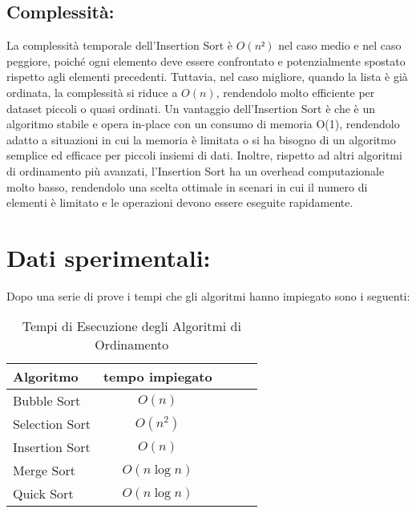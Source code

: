\documentclass[a4paper]{article}
\begin{document}
\subsection{Complessità:}
La complessità temporale dell’Insertion Sort è \(O(n²)\) nel caso medio e nel caso peggiore, poiché ogni elemento deve essere confrontato e potenzialmente
spostato rispetto agli elementi precedenti. Tuttavia, nel caso migliore, quando la lista è già ordinata, la complessità si riduce a \(O(n)\), rendendolo
molto efficiente per dataset piccoli o quasi ordinati. Un vantaggio dell’Insertion Sort è che è un algoritmo stabile e opera in-place con un consumo 
di memoria O(1), rendendolo adatto a situazioni in cui la memoria è limitata o si ha bisogno di un algoritmo semplice ed efficace per piccoli insiemi 
di dati. Inoltre, rispetto ad altri algoritmi di ordinamento più avanzati, l'Insertion Sort ha un overhead computazionale molto basso, rendendolo una 
scelta ottimale in scenari in cui il numero di elementi è limitato e le operazioni devono essere eseguite rapidamente.
\section{Dati sperimentali:}
Dopo una serie di prove i tempi che gli algoritmi hanno impiegato sono i seguenti:
\begin{table}[h]
    \centering
    \caption{Tempi di Esecuzione degli Algoritmi di Ordinamento}
    \begin{tabular}{lcccc}
    \toprule
    \textbf{Algoritmo} & \textbf{tempo impiegato} \\
    \midrule
    Bubble Sort & $O(n)$ \\
    Selection Sort & $O(n^2)$ \\
    Insertion Sort & $O(n)$ \\
    Merge Sort & $O(n \log n)$ \\
    Quick Sort & $O(n \log n)$ \\
    \bottomrule
    \end{tabular}
    \label{tab:sorting-algorithms}
\end{table}
\end{document}
